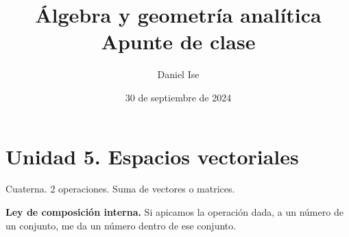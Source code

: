 \documentclass[12pt]{article}
\title{Álgebra y geometría analítica\\Apunte de clase}
\author{Daniel Ise}
\date{30 de septiembre de 2024}
\begin{document}
\maketitle

\tableofcontents

\pagebreak

\section{Unidad 5. Espacios vectoriales}

Cuaterna. 2 operaciones.
Suma de vectores o matrices. 

\textbf{Ley de composición interna.}
Si apicamos la operación dada,
a un número de un conjunto,
me da un número dentro de ese conjunto.
\end{document}
